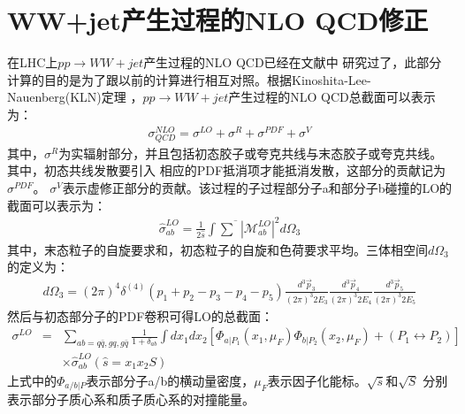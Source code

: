 \section{WW+jet产生过程的NLO QCD修正}
在LHC上$pp \to WW + jet$产生过程的NLO QCD已经在文献\cite{Cambell:pp2WWjet,Ditt:pp2WWjet,Ditt:prl}中
研究过了，此部分计算的目的是为了跟以前的计算进行相互对照。根据Kinoshita-Lee-Nauenberg(KLN)定理
\cite{KLNtheorem-K,KLNtheorem-LN}，$pp\to WW+jet$产生过程的NLO QCD总截面可以表示为：
\begin{eqnarray}
\sigma^{NLO}_{QCD} = \sigma^{LO} + \sigma^{R} + \sigma^{PDF} + \sigma^{V}
\end{eqnarray}
其中，$\sigma^R$为实辐射部分，并且包括初态胶子或夸克共线与末态胶子或夸克共线。其中，初态共线发散要引入
相应的PDF抵消项才能抵消发散，这部分的贡献记为$\sigma^{PDF}$。
$\sigma^V$表示虚修正部分的贡献。该过程的子过程部分子a和部分子b碰撞的LO的截面可以表示为：
\begin{eqnarray}
\hat{\sigma}^{LO}_{ab} = \frac{1}{2\hat{s}} \int \overline{\sum} \left|\mathcal{M}_{ab}^{LO}\right|^2 
d\Omega_3
\end{eqnarray}
其中，末态粒子的自旋要求和，初态粒子的自旋和色荷要求平均。三体相空间$d\Omega_3$的定义为：
\begin{eqnarray}
d\Omega_3
=
(2 \pi)^4 \delta^{(4)}(p_1+p_2-p_3-p_4-p_5)
\frac{d^3 \vec{p}_3}{(2\pi)^3 2E_3}
\frac{d^3 \vec{p}_4}{(2\pi)^3 2E_4}
\frac{d^3 \vec{p}_5}{(2\pi)^3 2E_5}
\end{eqnarray}
然后与初态部分子的PDF卷积可得LO的总截面：
\begin{eqnarray}
\sigma^{LO} &=& \sum\limits_{ab=q\bar{q},gq,g\bar{q}} \frac{1}{1+\delta_{ab}}\int dx_1 dx_2 \left[
\Phi_{a|P_1}(x_1,\mu_F)\Phi_{b|P_2}(x_2,\mu_F) + (P_1\leftrightarrow P_2)\right] 
\nonumber \\
&& \times \hat{\sigma}^{LO}_{ab} (\hat{s} = x_1 x_2 S)
\end{eqnarray}
上式中的$\Phi_{a/b|P}$表示部分子a/b的横动量密度，$\mu_F$表示因子化能标。$\sqrt{\bar s}$和$\sqrt{S}$
分别表示部分子质心系和质子质心系的对撞能量。

